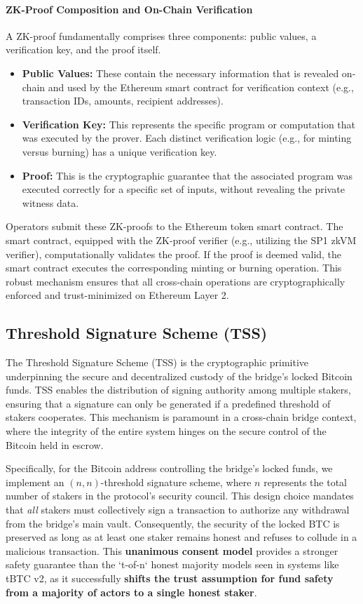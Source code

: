 \documentclass{DESSThesis}
\begin{document}
\paragraph{ZK-Proof Composition and On-Chain Verification}
A ZK-proof fundamentally comprises three components: public values, a verification key, and the proof itself.
\begin{itemize}
    \item \textbf{Public Values:} These contain the necessary information that is revealed on-chain and used by the Ethereum smart contract for verification context (e.g., transaction IDs, amounts, recipient addresses).
    \item \textbf{Verification Key:} This represents the specific program or computation that was executed by the prover. Each distinct verification logic (e.g., for minting versus burning) has a unique verification key.
    \item \textbf{Proof:} This is the cryptographic guarantee that the associated program was executed correctly for a specific set of inputs, without revealing the private witness data.
\end{itemize}
Operators submit these ZK-proofs to the Ethereum token smart contract. The smart contract, equipped with the ZK-proof verifier (e.g., utilizing the SP1 zkVM verifier), computationally validates the proof. If the proof is deemed valid, the smart contract executes the corresponding minting or burning operation. This robust mechanism ensures that all cross-chain operations are cryptographically enforced and trust-minimized on Ethereum Layer 2.



\subsection{Threshold Signature Scheme (TSS)} \label{subsec:tss-integration}

The Threshold Signature Scheme (TSS) is the cryptographic primitive underpinning the secure and decentralized custody of the bridge's locked Bitcoin funds. TSS enables the distribution of signing authority among multiple stakers, ensuring that a signature can only be generated if a predefined threshold of stakers cooperates. This mechanism is paramount in a cross-chain bridge context, where the integrity of the entire system hinges on the secure control of the Bitcoin held in escrow.

Specifically, for the Bitcoin address controlling the bridge's locked funds, we implement an $(n, n)$-threshold signature scheme, where $n$ represents the total number of stakers in the protocol's security council. This design choice mandates that \textit{all} stakers must collectively sign a transaction to authorize any withdrawal from the bridge's main vault. Consequently, the security of the locked BTC is preserved as long as at least one staker remains honest and refuses to collude in a malicious transaction. This \textbf{unanimous consent model} provides a stronger safety guarantee than the `t-of-n` honest majority models seen in systems like tBTC v2, as it successfully \textbf{shifts the trust assumption for fund safety from a majority of actors to a single honest staker}.
\end{document}
